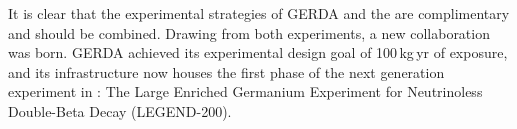 It is clear that the experimental strategies of GERDA and the {\MJDEMit} are complimentary and should be combined. Drawing from both experiments, a new collaboration was born. GERDA achieved its experimental design goal of 100\,kg\,yr of exposure, and its infrastructure now houses the first phase of the next generation \novbb{} experiment in \geEn{}: The Large Enriched Germanium Experiment for Neutrinoless Double-Beta Decay (LEGEND-200).